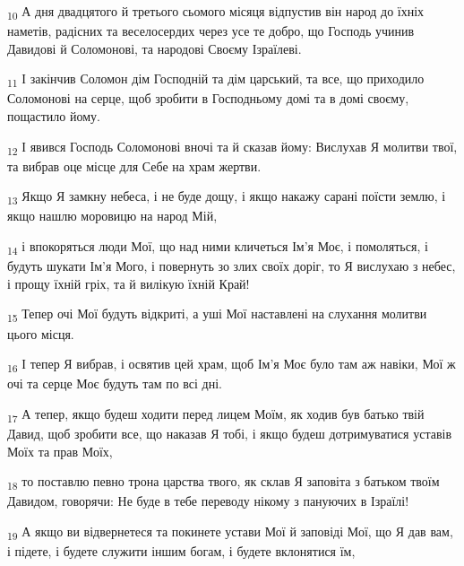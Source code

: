 \begin{tcolorbox}
\textsubscript{10} А дня двадцятого й третього сьомого місяця відпустив він народ до їхніх наметів, радісних та веселосердих через усе те добро, що Господь учинив Давидові й Соломонові, та народові Своєму Ізраїлеві.
\end{tcolorbox}
\begin{tcolorbox}
\textsubscript{11} І закінчив Соломон дім Господній та дім царський, та все, що приходило Соломонові на серце, щоб зробити в Господньому домі та в домі своєму, пощастило йому.
\end{tcolorbox}
\begin{tcolorbox}
\textsubscript{12} І явився Господь Соломонові вночі та й сказав йому: Вислухав Я молитви твої, та вибрав оце місце для Себе на храм жертви.
\end{tcolorbox}
\begin{tcolorbox}
\textsubscript{13} Якщо Я замкну небеса, і не буде дощу, і якщо накажу сарані поїсти землю, і якщо нашлю моровицю на народ Мій,
\end{tcolorbox}
\begin{tcolorbox}
\textsubscript{14} і впокоряться люди Мої, що над ними кличеться Ім'я Моє, і помоляться, і будуть шукати Ім'я Мого, і повернуть зо злих своїх доріг, то Я вислухаю з небес, і прощу їхній гріх, та й вилікую їхній Край!
\end{tcolorbox}
\begin{tcolorbox}
\textsubscript{15} Тепер очі Мої будуть відкриті, а уші Мої наставлені на слухання молитви цього місця.
\end{tcolorbox}
\begin{tcolorbox}
\textsubscript{16} І тепер Я вибрав, і освятив цей храм, щоб Ім'я Моє було там аж навіки, Мої ж очі та серце Моє будуть там по всі дні.
\end{tcolorbox}
\begin{tcolorbox}
\textsubscript{17} А тепер, якщо будеш ходити перед лицем Моїм, як ходив був батько твій Давид, щоб зробити все, що наказав Я тобі, і якщо будеш дотримуватися уставів Моїх та прав Моїх,
\end{tcolorbox}
\begin{tcolorbox}
\textsubscript{18} то поставлю певно трона царства твого, як склав Я заповіта з батьком твоїм Давидом, говорячи: Не буде в тебе переводу нікому з пануючих в Ізраїлі!
\end{tcolorbox}
\begin{tcolorbox}
\textsubscript{19} А якщо ви відвернетеся та покинете устави Мої й заповіді Мої, що Я дав вам, і підете, і будете служити іншим богам, і будете вклонятися їм,
\end{tcolorbox}
